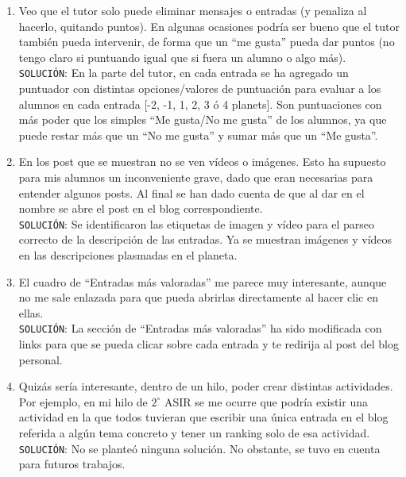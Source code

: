 \documentclass[a4paper, 12pt]{book}
\begin{document}
\begin{itemize}
\begin{enumerate}
		$N^\circ$ no me gusta (recibidos y dados) -- Comentarios (recibidos y dados)].
		Tambi\'en se muestra un resumen de las entradas de cada uno de los alumnos.
		Respecto al mecanismo de penalizaci\'on o limitaci\'on de ``Me gusta'', se pensar\'a para futuras implementaciones.
		\item Veo que el tutor solo puede eliminar mensajes o entradas (y penaliza al hacerlo, quitando puntos). En algunas ocasiones podr\'ia ser 
		bueno que el tutor tambi\'en pueda intervenir, de forma que un ``me gusta'' pueda dar puntos (no tengo claro si puntuando igual que si fuera 
		un alumno o algo m\'as).\\
		\texttt{SOLUCI\'ON}: En la parte del tutor, en cada entrada se ha agregado un puntuador con distintas opciones/valores de puntuaci\'on para 
		evaluar a los alumnos en cada entrada [-2, -1, 1, 2, 3 \'o 4 planets]. Son puntuaciones con m\'as poder que los simples 
		``Me gusta/No me gusta'' de los alumnos, ya que puede restar m\'as que un ``No me gusta'' y sumar m\'as que un ``Me gusta''.
		\item En los post que se muestran no se ven v\'ideos o im\'agenes. Esto ha supuesto para mis alumnos un inconveniente grave, dado que eran 
		necesarias para entender algunos posts. Al final se han dado cuenta de que al dar en el nombre se abre el post en el blog correspondiente.\\
		\texttt{SOLUCI\'ON}: Se identificaron las etiquetas de imagen y v\'ideo para el parseo correcto de la descripci\'on de las entradas. Ya se 
		muestran im\'agenes y v\'ideos en las descripciones plasmadas en el planeta.
		\item El cuadro de ``Entradas m\'as valoradas'' me parece muy interesante, aunque no me sale enlazada para que pueda abrirlas directamente 
		al hacer clic en ellas.\\
		\texttt{SOLUCI\'ON}: La secci\'on de ``Entradas m\'as valoradas'' ha sido modificada con links para que se pueda clicar sobre cada entrada 
		y te redirija al post del blog personal.
		\item Quiz\'as ser\'ia interesante, dentro de un hilo, poder crear distintas actividades. Por ejemplo, en mi hilo de $2^\circ$ ASIR se me 
		ocurre que podr\'ia existir una actividad en la que todos tuvieran que escribir una \'unica entrada en el blog referida a alg\'un tema 
		concreto y tener un ranking solo de esa actividad.\\
		\texttt{SOLUCI\'ON}: No se plante\'o ninguna soluci\'on. No obstante, se tuvo en cuenta para futuros trabajos.\\\\
	\end{enumerate}


\end{itemize}
\end{document}
